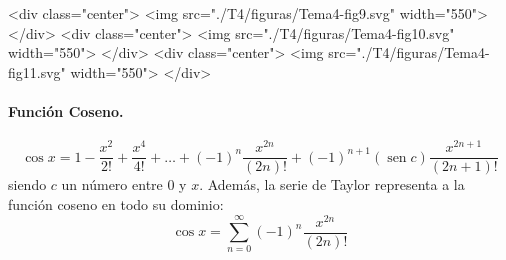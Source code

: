 \begin{rawhtml}
<div class="center">
<img src="./T4/figuras/Tema4-fig9.svg" width="550">
</div>
<div class="center">
<img src="./T4/figuras/Tema4-fig10.svg" width="550">
</div>
<div class="center">
<img src="./T4/figuras/Tema4-fig11.svg" width="550">
</div>
\end{rawhtml}

\paragraph{Función Coseno.}
\[
\cos x=1-\frac{x^2}{2!}+\frac{x^4}{4!}+\dots+(-1)^n\frac{x^{2n}}{(2n)!}
+(-1)^{n+1}(\operatorname{sen} c)\frac{x^{2n+1}}{(2n+1)!}
\]
siendo $c$ un número entre 0 y $x$. 
Además, la serie de Taylor representa a la función coseno en todo su dominio:
\[
\cos x=\displaystyle\sum_{n=0}^\infty   (-1)^n\frac{x^{2n}}{(2n)!}
\]

